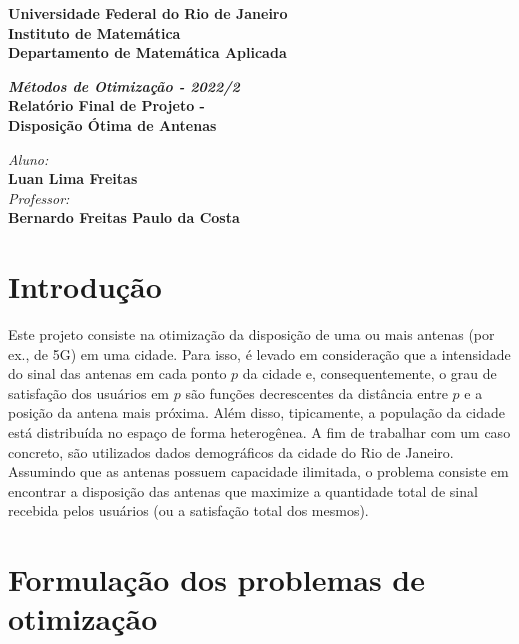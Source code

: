 \documentclass[a4paper,12pt]{article}
\begin{document}
	

\vspace*{-1in}
\begin{center}
	\textbf{Universidade Federal do Rio de Janeiro} \\
	\textbf{\small Instituto de Matemática \\ Departamento de Matemática Aplicada} \\
	
	\vspace{1.5in}
	
	\textit{\textbf{\Large Métodos de Otimização - 2022/2}} \\
	\textbf{\huge Relatório Final de Projeto - \\ Disposição Ótima de Antenas}
	
	\vspace{1.5in}
	
	\textit{\large Aluno:} \\
	\textbf{\Large Luan Lima Freitas} \\
	
	\vspace{0.5in}
	\textit{\large Professor:} \\
	\textbf{\large Bernardo Freitas Paulo da Costa}
\end{center}

\newpage
{}

\tableofcontents
\newpage

\section{Introdução}
Este projeto consiste na otimização da disposição de uma ou mais antenas (por ex., de 5G) em uma cidade. Para isso, é levado em consideração que a intensidade do sinal das antenas em cada ponto $p$ da cidade e, consequentemente, o grau de satisfação dos usuários em $p$ são funções decrescentes da distância entre $p$ e a posição da antena mais próxima. Além disso, tipicamente, a população da cidade está distribuída no espaço de forma heterogênea. A fim de trabalhar com um caso concreto, são utilizados dados demográficos da cidade do Rio de Janeiro. Assumindo que as antenas possuem capacidade ilimitada, o problema consiste em encontrar a disposição das antenas que maximize a quantidade total de sinal recebida pelos usuários (ou a satisfação total dos mesmos).

\section{Formulação dos problemas de otimização}
\end{document}
